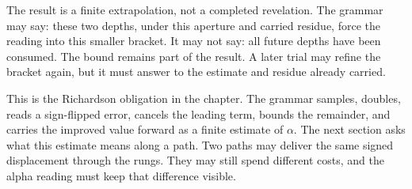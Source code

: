 The result is a finite extrapolation, not a completed revelation. The
grammar may say: these two depths, under this aperture and carried residue,
force the reading into this smaller bracket. It may not say: all future
depths have been consumed. The bound remains part of the result. A later
trial may refine the bracket again, but it must answer to the estimate and
residue already carried.

This is the Richardson obligation in the chapter. The grammar samples,
doubles, reads a sign-flipped error, cancels the leading term, bounds the
remainder, and carries the improved value forward as a finite estimate of
\(\alpha\). The next section asks what this estimate means along a path.
Two paths may deliver the same signed displacement through the rungs. They
may still spend different costs, and the alpha reading must keep that
difference visible.
